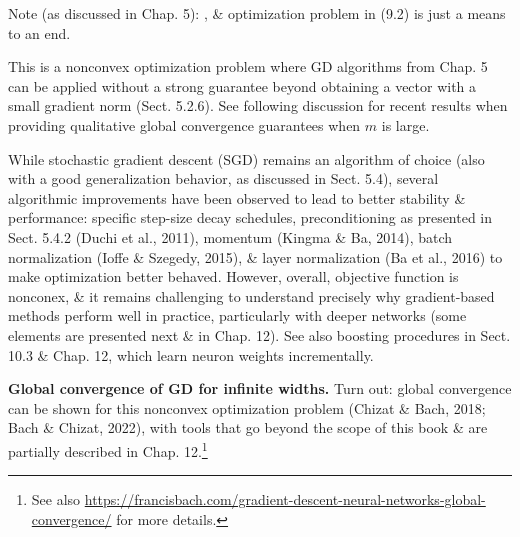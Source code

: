 \documentclass{article}
\begin{document}
\begin{enumerate}
\begin{itemize}
\begin{itemize}
\begin{itemize}
				Note (as discussed in Chap. 5): , \& optimization problem in (9.2) is just a means to an end.
				
				This is a nonconvex optimization problem where GD algorithms from Chap. 5 can be applied without a strong guarantee beyond obtaining a vector with a small gradient norm (Sect. 5.2.6). See following discussion for recent results when providing qualitative global convergence guarantees when $m$ is large.
				
				While stochastic gradient descent (SGD) remains an algorithm of choice (also with a good generalization behavior, as discussed in Sect. 5.4), several algorithmic improvements have been observed to lead to better stability \& performance: specific step-size decay schedules, preconditioning as presented in Sect. 5.4.2 (Duchi et al., 2011), momentum (Kingma \& Ba, 2014), batch normalization (Ioﬀe \& Szegedy, 2015), \& layer normalization (Ba et al., 2016) to make optimization better behaved. However, overall, objective function is nonconex, \& it remains challenging to understand precisely why gradient-based methods perform well in practice, particularly with deeper networks (some elements are presented next \& in Chap. 12). See also boosting procedures in Sect. 10.3 \& Chap. 12, which learn neuron weights incrementally.
				
				{\bf Global convergence of GD for infinite widths.} Turn out: global convergence can be shown for this nonconvex optimization problem (Chizat \& Bach, 2018; Bach \& Chizat, 2022), with tools that go beyond the scope of this book \& are partially described in Chap. 12.\footnote{See also \url{https://francisbach.com/gradient-descent-neural-networks-global-convergence/} for more details.}
				

\end{itemize}
\end{itemize}
\end{itemize}
\end{enumerate}
\end{document}
